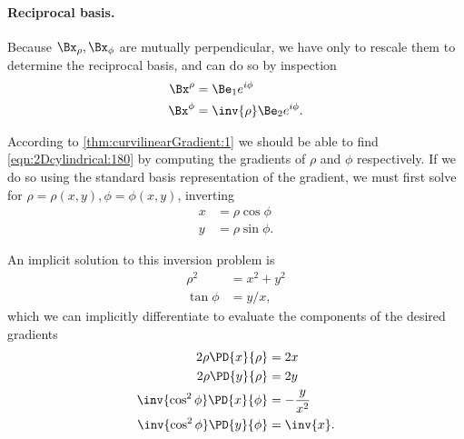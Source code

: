 \paragraph{Reciprocal basis.}
Because \( \Bx_\rho, \Bx_\phi \) are mutually perpendicular, we have only to rescale them to determine the reciprocal basis, and can do so by inspection
\begin{equation}\label{eqn:2Dcylindrical:180}
\begin{aligned}
   \Bx^\rho &= \Be_1 e^{i \phi} \\
   \Bx^\phi &= \inv{\rho} \Be_2 e^{i\phi}.
\end{aligned}
\end{equation}

According to \cref{thm:curvilinearGradient:1}
we should be able to find \cref{eqn:2Dcylindrical:180} by computing the gradients of \( \rho \) and \( \phi \) respectively.
If we do so using the  standard basis representation of the gradient, we must first solve for \( \rho = \rho(x,y), \phi = \phi(x,y) \), inverting
\begin{equation}\label{eqn:2Dcylindrical:620}
\begin{aligned}
x &= \rho \cos\phi \\
y &= \rho \sin\phi.
\end{aligned}
\end{equation}

An implicit solution to this inversion problem is
\begin{equation}\label{eqn:2Dcylindrical:500}
\begin{aligned}
\rho^2 &= x^2 + y^2 \\
\tan\phi &= y/x,
\end{aligned}
\end{equation}
which we can implicitly differentiate to evaluate the components of the desired gradients
\begin{equation}\label{eqn:2Dcylindrical:520}
\begin{aligned}
2 \rho \PD{x}{\rho} &= 2 x \\
2 \rho \PD{y}{\rho} &= 2 y \\
\inv{\cos^2\phi} \PD{x}{\phi} &= -\frac{y}{x^2} \\
\inv{\cos^2\phi} \PD{y}{\phi} &= \inv{x}.
\end{aligned}
\end{equation}

